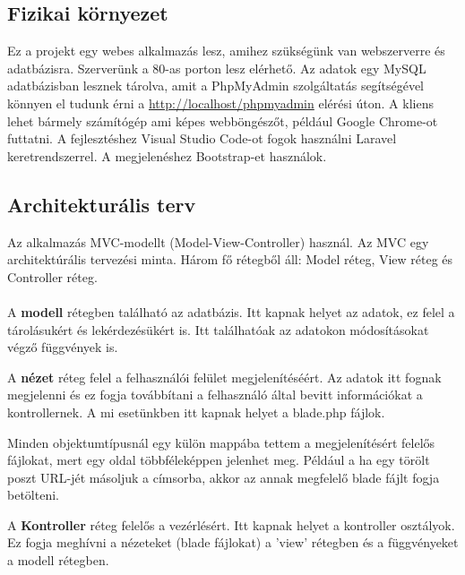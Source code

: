 \documentclass[
]{thesis-ekf}
\theoremstyle{definition}
\theoremstyle{remark}
\begin{document}
\subsection{Fizikai környezet}

Ez a projekt egy webes alkalmazás lesz, amihez szükségünk van webszerverre és adatbázisra. Szerverünk a 80-as porton lesz elérhető. Az adatok egy MySQL adatbázisban lesznek tárolva, amit a PhpMyAdmin szolgáltatás segítségével könnyen el tudunk érni a \url{http://localhost/phpmyadmin} elérési úton. A kliens lehet bármely számítógép ami képes webböngészőt, például Google Chrome-ot futtatni. A fejlesztéshez Visual Studio Code-ot fogok használni Laravel keretrendszerrel. A megjelenéshez Bootstrap-et használok.

\subsection{Architekturális terv}

Az alkalmazás MVC-modellt (Model-View-Controller) használ. Az MVC egy architektúrális tervezési minta. Három fő rétegből áll: Model réteg, View réteg és Controller réteg.
\\\\
A \textbf{modell} rétegben található az adatbázis. Itt kapnak helyet az adatok, ez felel a tárolásukért és lekérdezésükért is. Itt találhatóak az adatokon módosításokat végző függvények is.


\vspace{5mm}
A \textbf{nézet} réteg felel a felhasználói felület megjelenítéséért. Az adatok itt fognak megjelenni és ez fogja továbbítani a felhasználó által bevitt információkat a kontrollernek. A mi esetünkben itt kapnak helyet a blade.php fájlok.

Minden objektumtípusnál egy külön mappába tettem a megjelenítésért felelős fájlokat, mert egy oldal többféleképpen jelenhet meg. Például a ha egy törölt poszt URL-jét másoljuk a címsorba, akkor az annak megfelelő blade fájlt fogja betölteni.


\vspace{5mm}

A \textbf{Kontroller} réteg felelős a vezérlésért. Itt kapnak helyet a kontroller osztályok. Ez fogja meghívni a nézeteket (blade fájlokat) a 'view' rétegben és a függvényeket a modell rétegben.
\end{document}
